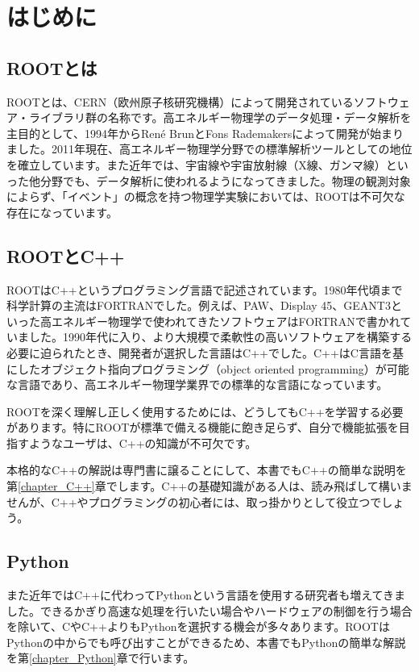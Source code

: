 \chapter{はじめに}

\section{ROOTとは}
ROOTとは、CERN（欧州原子核研究機構）によって開発されているソフトウェア・ライブラリ群の名称です。高エネルギー物理学のデータ処理・データ解析を主目的として、1994年からRen\'e BrunとFons Rademakersによって開発が始まりました。2011年現在、高エネルギー物理学分野での標準解析ツールとしての地位を確立しています。また近年では、宇宙線や宇宙放射線（X線、ガンマ線）といった他分野でも、データ解析に使われるようになってきました。物理の観測対象によらず、「イベント」の概念を持つ物理学実験においては、ROOTは不可欠な存在になっています。

\section{ROOTとC++}
ROOTはC++というプログラミング言語で記述されています。1980年代頃まで科学計算の主流はFORTRANでした。例えば、PAW、Display 45、GEANT3といった高エネルギー物理学で使われてきたソフトウェアはFORTRANで書かれていました。1990年代に入り、より大規模で柔軟性の高いソフトウェアを構築する必要に迫られたとき、開発者が選択した言語はC++でした。C++はC言語を基にしたオブジェクト指向プログラミング（object oriented programming）が可能な言語であり、高エネルギー物理学業界での標準的な言語になっています。

ROOTを深く理解し正しく使用するためには、どうしてもC++を学習する必要があります。特にROOTが標準で備える機能に飽き足らず、自分で機能拡張を目指すようなユーザは、C++の知識が不可欠です。

本格的なC++の解説は専門書に譲ることにして、本書でもC++の簡単な説明を第\ref{chapter_C++}章でします。C++の基礎知識がある人は、読み飛ばして構いませんが、C++やプログラミングの初心者には、取っ掛かりとして役立つでしょう。

\section{Python}
また近年ではC++に代わってPythonという言語を使用する研究者も増えてきました。できるかぎり高速な処理を行いたい場合やハードウェアの制御を行う場合を除いて、CやC++よりもPythonを選択する機会が多々あります。ROOTはPythonの中からでも呼び出すことができるため、本書でもPythonの簡単な解説を第\ref{chapter_Python}章で行います。

